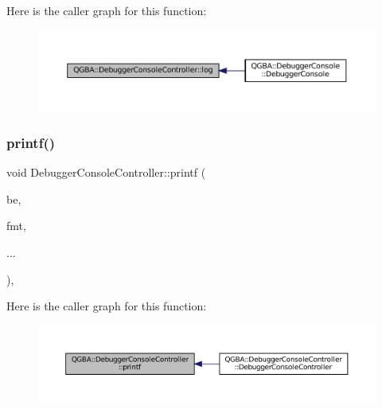 Here is the caller graph for this function\+:
\nopagebreak
\begin{figure}[H]
\begin{center}
\leavevmode
\includegraphics[width=350pt]{class_q_g_b_a_1_1_debugger_console_controller_aa05a49c51ae87e6a2c6be925b6b9d85e_icgraph}
\end{center}
\end{figure}
\mbox{\label{class_q_g_b_a_1_1_debugger_console_controller_aaae3fe25316ede20b3000031c547ae68}} 
\subsubsection{\texorpdfstring{printf()}{printf()}}
{\footnotesize\ttfamily void Debugger\+Console\+Controller\+::printf (\begin{DoxyParamCaption}\item[{struct C\+L\+I\+Debugger\+Backend $\ast$}]{be,  }\item[{const char $\ast$}]{fmt,  }\item[{}]{... }\end{DoxyParamCaption})\hspace{0.3cm}{\ttfamily [static]}, {\ttfamily [private]}}

Here is the caller graph for this function\+:
\nopagebreak
\begin{figure}[H]
\begin{center}
\leavevmode
\includegraphics[width=350pt]{class_q_g_b_a_1_1_debugger_console_controller_aaae3fe25316ede20b3000031c547ae68_icgraph}
\end{center}
\end{figure}
\mbox{\label{class_q_g_b_a_1_1_debugger_console_controller_a67c80cd51a818693fe1d8d27bcadbcce}} 
